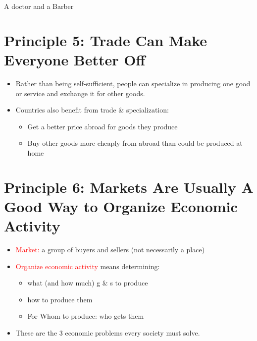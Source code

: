\documentclass[
]{book}
\providecommand{\tightlist}{%
  \setlength{\itemsep}{0pt}\setlength{\parskip}{0pt}}
\begin{document}
A doctor and a Barber

\hypertarget{principle-5-trade-can-make-everyone-better-off}{%
\section{Principle 5: Trade Can Make Everyone Better Off}\label{principle-5-trade-can-make-everyone-better-off}}

\begin{itemize}
\item
  Rather than being self-sufficient, people can specialize in producing one good or service and exchange it for other goods.
\item
  Countries also benefit from trade \& specialization:

  \begin{itemize}
  \tightlist
  \item
    Get a better price abroad for goods they produce
  \item
    Buy other goods more cheaply from abroad than could be produced at home
  \end{itemize}
\end{itemize}

\hypertarget{principle-6-markets-are-usually-a-good-way-to-organize-economic-activity}{%
\section{Principle 6: Markets Are Usually A Good Way to Organize Economic Activity}\label{principle-6-markets-are-usually-a-good-way-to-organize-economic-activity}}

\begin{itemize}
\item
  \textcolor{red}{ Market:} a group of buyers and sellers (not necessarily a place)
\item
  \textcolor{red}{Organize economic activity} means determining:

  \begin{itemize}
  \tightlist
  \item
    what (and how much) g \& s to produce
  \item
    how to produce them\\
  \item
    For Whom to produce: who gets them
  \end{itemize}
\item
  These are the 3 economic problems every society must solve.
\end{itemize}
\end{document}
